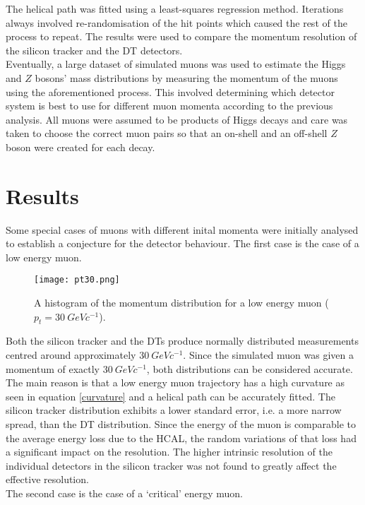 \documentclass{article}
\begin{document}
The helical path was fitted using a least-squares regression method.
Iterations always involved re-randomisation of the hit points which caused the rest of the process to repeat. The results were used to compare the momentum resolution of the silicon tracker and the DT detectors.\\

Eventually, a large dataset of simulated muons was used to estimate the Higgs and $Z$ bosons' mass distributions by measuring the momentum of the muons using the aforementioned process. This involved determining which detector system is best to use for different muon momenta according to the previous analysis. All muons were assumed to be products of Higgs decays and care was taken to choose the correct muon pairs so that an on-shell and an off-shell $Z$ boson were created for each decay.

\section*{Results}

Some special cases of muons with different inital momenta were initially analysed to establish a conjecture for the detector behaviour. The first case is the case of a low energy muon.

\begin{figure}[h]
\centering
\texttt{[image: pt30.png]}
\caption{A histogram of the momentum distribution for a low energy muon ($p_t=30\ GeVc^{-1}$).}
	\label{pt30}
\end{figure}

Both the silicon tracker and the DTs produce normally distributed measurements centred around approximately $30\ GeVc^{-1}$. Since the simulated muon was given a momentum of exactly $30\ GeVc^{-1}$, both distributions can be considered accurate. The main reason is that a low energy muon trajectory has a high curvature as seen in equation \ref{curvature} and a helical path can be accurately fitted. The silicon tracker distribution exhibits a lower standard error, i.e. a more narrow spread, than the DT distribution. Since the energy of the muon is comparable to the average energy loss due to the HCAL, the random variations of that loss had a significant impact on the resolution. The higher intrinsic resolution of the individual detectors in the silicon tracker was not found to greatly affect the effective resolution.\\

The second case is the case of a `critical' energy muon.
\end{document}

